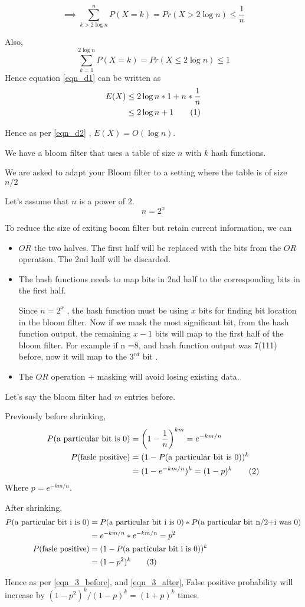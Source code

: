 \documentclass{homeworg}
\newcommand\numberthis{\addtocounter{equation}{1}\tag{\theequation}}
\begin{document}
\[
    \implies \sum_{k > 2\log n}^n P(X=k) = Pr({X> 2 \log n}) \le \frac{1}{n}
\]

Also,
\[
    \sum_{k=1}^{2\log n} P(X=k) = Pr({X\le 2 \log n}) \le 1
\]
Hence equation \ref{eqn_d1} can be written as
\begin{align*}
    E(X) &\le 2 \log n \ast 1 +n \ast \frac{1}{n}\\
    &\le 2\log n +1 \numberthis\label{eqn_d2}
\end{align*}

Hence as per \ref{eqn_d2} ,     $E(X) = O(\log n)$.

\newpage
\exercise
We have a bloom filter that uses a table of size $n$ with $k$ hash functions.

We are asked to adapt your Bloom filter to a setting where the table is of size $n/2$

Let's assume that $n$ is a power of $2$.
\[
    n = 2^x
\]

To reduce the size of exiting boom filter but retain current information, we can \begin{itemize}
    \item $OR$ the two halves. The first half will be replaced with the bits from the $OR$ operation. The 2nd half will be discarded.
    \item The hash functions needs to map bits in 2nd half to the corresponding bits in the first half. 
    
    Since $n=2^x$ , the hash function must be using $x$ bits for finding bit location in the bloom filter. Now if we mask the most significant bit, from the hash function output, the remaining $x-1$ bits will map to the first half of the bloom filter. For example if n =8, and hash function output was 7(111) before, now it will map to the $3^{rd}$ bit .
    \item The $OR$ operation + masking will avoid losing existing data.
\end{itemize}

Let's say the bloom filter had $m$ entries before. 

Previously before shrinking, 
\begin{align*}
    P(\text{a particular bit is 0}) &= \left(1-\frac{1}{n}\right)^{km} = e^{-km/n}\\
    P(\text{fasle positive}) &= (1-P(\text{a particular bit is 0}))^k\\
    &= (1-e^{-km/n})^k = (1-p)^k\numberthis\label{eqn_3_before}
\end{align*}
Where $p = e^{-km/n}$.

After shrinking, 
\begin{align*}
    P(\text{a particular bit i is 0}) &= P(\text{a particular bit i is 0}) \ast P(\text{a particular bit n/2+i was 0})  \\
    &= e^{-km/n} \ast e^{-km/n} = p^2\\
    P(\text{fasle positive}) &= (1-P(\text{a particular bit i is 0}))^k\\
    &= (1-p^2)^k\numberthis\label{eqn_3_after}
\end{align*}

Hence as per \ref{eqn_3_before}, and \ref{eqn_3_after},
False positive probability will increase by $(1-p^2)^k/ (1-p)^k = (1+p)^k$ times. 
\end{document}
